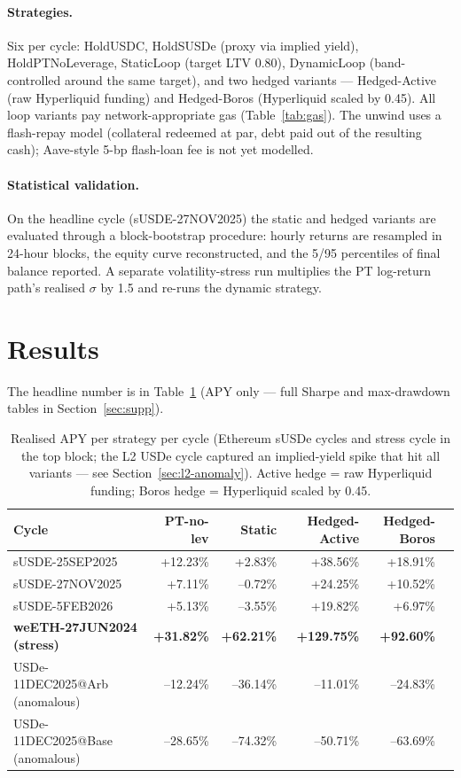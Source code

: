 \documentclass[11pt,a4paper]{article}
\begin{document}
\paragraph{Strategies.} Six per cycle: HoldUSDC, HoldSUSDe (proxy
via implied yield), HoldPTNoLeverage, StaticLoop (target LTV 0.80),
DynamicLoop (band-controlled around the same target), and two
hedged variants — Hedged-Active (raw Hyperliquid funding) and
Hedged-Boros (Hyperliquid scaled by 0.45). All loop variants pay
network-appropriate gas (Table~\ref{tab:gas}). The unwind uses a
flash-repay model (collateral redeemed at par, debt paid out of
the resulting cash); Aave-style 5-bp flash-loan fee is not yet
modelled.

\paragraph{Statistical validation.} On the headline cycle
(sUSDE-27NOV2025) the static and hedged variants are evaluated
through a block-bootstrap procedure: hourly returns are
resampled in 24-hour blocks, the equity curve reconstructed,
and the 5/95 percentiles of final balance reported. A separate
volatility-stress run multiplies the PT log-return path's
realised \(\sigma\) by 1.5 and re-runs the dynamic strategy.

\section{Results}
\label{sec:results}

The headline number is in Table~\ref{tab:headline} (APY only —
full Sharpe and max-drawdown tables in Section~\ref{sec:supp}).

\begin{table}[ht]
\centering
\footnotesize
\begin{tabular}{lrrrrr}
\toprule
Cycle &
PT-no-lev &
Static &
Hedged-Active &
Hedged-Boros &
\\
\midrule
sUSDE-25SEP2025                    &  +12.23\% &   +2.83\% &     +38.56\% &  +18.91\% \\
sUSDE-27NOV2025                    &   +7.11\% &  --0.72\% &     +24.25\% &  +10.52\% \\
sUSDE-5FEB2026                     &   +5.13\% &  --3.55\% &     +19.82\% &   +6.97\% \\
\textbf{weETH-27JUN2024 (stress)}  & \textbf{+31.82\%} & \textbf{+62.21\%} & \textbf{+129.75\%} & \textbf{+92.60\%} \\
\midrule
USDe-11DEC2025@Arb (anomalous)     & --12.24\% & --36.14\% &     --11.01\% & --24.83\% \\
USDe-11DEC2025@Base (anomalous)    & --28.65\% & --74.32\% &     --50.71\% & --63.69\% \\
\bottomrule
\end{tabular}
\caption{Realised APY per strategy per cycle (Ethereum sUSDe
cycles and stress cycle in the top block; the L2 USDe cycle
captured an implied-yield spike that hit all variants — see
Section~\ref{sec:l2-anomaly}). Active hedge = raw Hyperliquid
funding; Boros hedge = Hyperliquid scaled by 0.45.}
\label{tab:headline}
\end{table}
\end{document}
